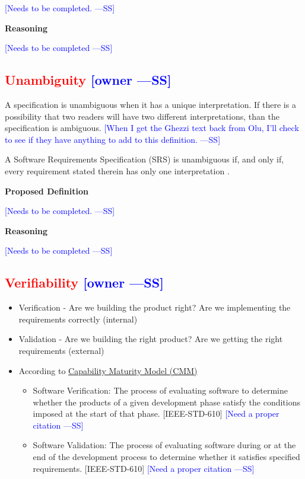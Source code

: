 \documentclass[letterpaper, cleveref]{lipics-v2019}
\newcommand{\authornote}[3]{\textcolor{#1}{[#3 ---#2]}}
\newcommand{\authornote}[3]{}
\newcommand{\wss}[1]{\authornote{blue}{SS}{#1}} %
\newcommand{\notdone}[1]{\textcolor{red}{#1}}
\theoremstyle{definition}
\begin{document}
\wss{Needs to be completed.}

\noindent \textbf{Reasoning}

\wss{Needs to be completed}


\subsection{\notdone{Unambiguity} \wss{owner}}

A specification is unambiguous when it has a unique interpretation.  If
there is a possibility that two readers will have two different
interpretations, than the specification is ambiguous.  \wss{When I get the
Ghezzi text back from Olu, I'll check to see if they have anything to add to
this definition.}

A Software Requirements Specification (SRS) is unambiguous if, and only if,
every requirement stated therein has only one interpretation \citep{IEEE1998}.

\noindent \textbf{Proposed Definition} 

\wss{Needs to be completed.}

\noindent \textbf{Reasoning}

\wss{Needs to be completed}


\subsection{\notdone{Verifiability} \wss{owner}}

\begin{itemize}
	
\item Verification - Are we building the product right?  Are we implementing
the requirements correctly (internal) \item Validation - Are we building the
right product? Are we getting the right requirements (external) \item
According to  \href{https://en.wikipedia.org/wiki/Software_verification_and_validation}
{Capability Maturity Model (CMM)}
  \begin{itemize}
  \item Software Verification: The process of evaluating software to determine
    whether the products of a given development phase satisfy the conditions
    imposed at the start of that phase. [IEEE-STD-610] \wss{Need a proper
      citation}
  \item Software Validation: The process of evaluating software during or at the
    end of the development process to determine whether it satisfies specified
    requirements. [IEEE-STD-610] \wss{Need a proper citation}
  \end{itemize}
\end{itemize}
\end{document}
